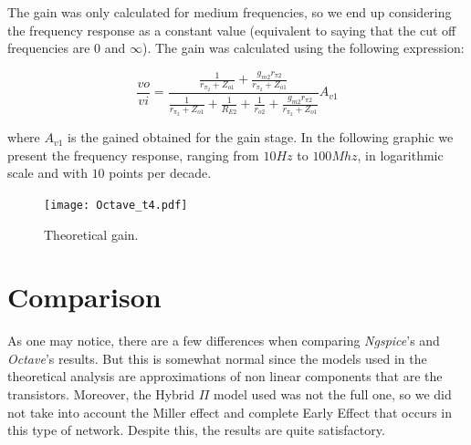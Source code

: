The gain was only calculated for medium frequencies, so we end up considering the frequency response as a 
constant value (equivalent to saying that the cut off frequencies are 0 and $\infty$). The gain was calculated using the following expression:

\begin{equation}
    \frac{v{o}}{v{i}}=\frac{\frac{1}{r_{\pi_{2}}+Z_{o1}}+\frac{g_{m2}r_{\pi2}}{r_{\pi_{2}}+Z_{o1}}}{\frac{1}{r_{\pi_{2}}+Z_{o1}}+\frac{1}{R_{E2}}+\frac{1}{r_{o2}}+\frac{g_{m2}r_{\pi2}}{r_{\pi_{2}}+Z_{o1}}}A_{v1}
\end{equation}

where $A_{v1}$ is the gained obtained for the gain stage.
 In the following graphic we present the frequency response, ranging from $10 Hz$ to $100 Mhz$, in logarithmic scale and with $10$ points per decade.

 \begin{figure}[H] \centering
    \texttt{[image: Octave\_t4.pdf]}
    \caption{Theoretical gain.}
    \label{fig:Octave_t4}
\end{figure}

\section{Comparison}

As one may notice, there are a few differences when comparing \textit{Ngspice}'s and \textit{Octave}'s results.
But this is somewhat normal since the models used in the theoretical analysis are approximations of non linear components that are the transistors.
Moreover, the Hybrid $\Pi$ model used was not the full one, so we did not take into account the Miller effect and complete Early Effect
that occurs in this type of network. Despite this, the results are quite satisfactory.
